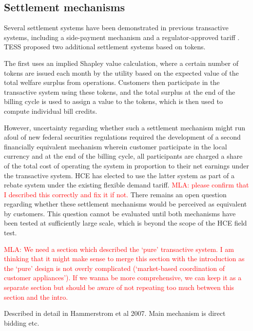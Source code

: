 \subsection{Settlement mechanisms}

Several settlement systems have been demonstrated in previous transactive systems, including a side-payment mechanism \cite{hammerstrom_2008} and a regulator-approved tariff \cite{Widergren2014}. TESS proposed two additional settlement systems based on tokens.  

The first uses an implied Shapley value calculation, where a certain number of tokens are issued each month by the utility based on the expected value of the total welfare surplus from operations.  Customers then participate in the transactive system using these tokens, and the total surplus at the end of the billing cycle is used to assign a value to the tokens, which is then used to compute individual bill credits.  

However, uncertainty regarding whether such a settlement mechanism might run afoul of new federal securities regulations required the development of a second financially equivalent mechanism wherein customer participate in the local currency and at the end of the billing cycle, all participants are charged a share of the total cost of operating the system in proportion to their net earnings under the transactive system. HCE has elected to use the latter system as part of a rebate system under the existing flexible demand tariff. \textcolor{red}{MLA: please confirm that I described this correctly and fix it if not.} There remains an open question regarding whether these settlement mechanisms would be perceived as equivalent by customers. This question cannot be evaluated until both mechanisms have been tested at sufficiently large scale, which is beyond the scope of the HCE field test.

\textcolor{red}{MLA: We need a section which described the `pure' transactive system. I am thinking that it might make sense to merge this section with the introduction as the `pure' design is not overly complicated (`market-based coordination of customer appliances'). If we wanna be more comprehensive, we can keep it as a separate section but should be aware of not repeating too much between this section and the intro.}

Described in detail in Hammerstrom et al 2007. Main mechanism is direct bidding etc.

